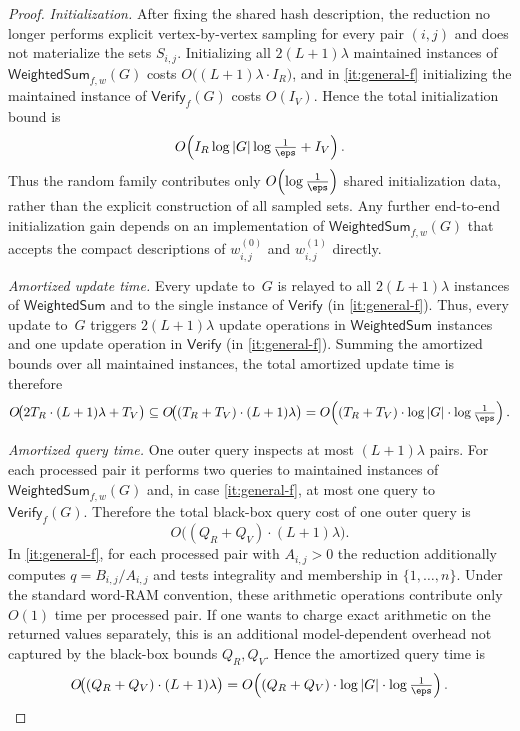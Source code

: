 \begin{proof}
\emph{Initialization.}
After fixing the shared hash description, the reduction no longer performs
explicit vertex-by-vertex sampling for every pair $(i,j)$ and does not
materialize the sets $S_{i,j}$.
Initializing all $2(L+1)\lambda$ maintained instances of
$\mathsf{WeightedSum}_{f,w}(G)$ costs
$O\!\bigl((L+1)\lambda\cdot I_R\bigr)$, and in
\cref{it:general-f} initializing the maintained instance of
$\mathsf{Verify}_f(G)$ costs $O(I_V)$.
Hence the total initialization bound is
\[
O\!\left(I_R\log|G|\log\tfrac{1}{\eps} + I_V\right).
\]
Thus the random family contributes only
$O\!\left(\log\tfrac{1}{\eps}\right)$ shared initialization data, rather than
the explicit construction of all sampled sets.
Any further end-to-end initialization gain depends on an implementation of
$\mathsf{WeightedSum}_{f,w}(G)$ that accepts the compact descriptions of
$w^{(0)}_{i,j}$ and $w^{(1)}_{i,j}$ directly.

\emph{Amortized update time.}
Every update to~$G$ is relayed to all $2(L+1)\lambda$ instances of
$\mathsf{WeightedSum}$ and to the single instance of $\mathsf{Verify}$
(in \cref{it:general-f}).
Thus, every update to~$G$ triggers $2(L+1)\lambda$ update operations in
$\mathsf{WeightedSum}$ instances and one update operation in
$\mathsf{Verify}$ (in \cref{it:general-f}).
Summing the amortized bounds over all maintained instances, the total
amortized update time is therefore
\[
O\!\bigl(2T_R\cdot (L+1)\lambda + T_V\bigr)
\subseteq
O\!\bigl((T_R+T_V)\cdot (L+1)\lambda\bigr)
=
O\!\left((T_R+T_V)\cdot \log|G|\cdot
\log\tfrac{1}{\eps}\right).
\]

\emph{Amortized query time.}
One outer query inspects at most $(L+1)\lambda$ pairs.
For each processed pair it performs two queries to maintained instances of
$\mathsf{WeightedSum}_{f,w}(G)$ and, in case \cref{it:general-f}, at most one
query to $\mathsf{Verify}_f(G)$.
Therefore the total black-box query cost of one outer query is
\[
O\!\bigl((Q_R+Q_V)\cdot (L+1)\lambda\bigr).
\]
In \cref{it:general-f}, for each processed pair with $A_{i,j}>0$ the reduction
additionally computes $q=B_{i,j}/A_{i,j}$ and tests integrality and membership
in $\{1,\dots,n\}$.
Under the standard word-RAM convention, these arithmetic operations contribute
only $O(1)$ time per processed pair.
If one wants to charge exact arithmetic on the returned values separately, this
is an additional model-dependent overhead not captured by the black-box bounds
$Q_R,Q_V$.
Hence the amortized query time is
\[
O\!\bigl((Q_R+Q_V)\cdot (L+1)\lambda\bigr)
=
O\!\left((Q_R+Q_V)\cdot \log|G|\cdot
\log\tfrac{1}{\eps}\right).
\]


\end{proof}
